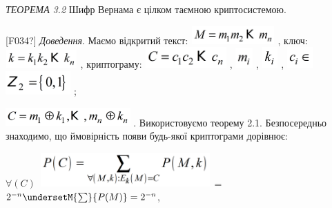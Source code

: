 \bigskip

\textit{ТЕОРЕМА }\textit{3}\textit{.2  }Шифр Вернама є цілком таємною
криптосистемою.

\textlatin{[F034?]} \textit{Доведення}. Маємо відкритий текст: 
\includegraphics[width=1.2591in,height=0.2709in]{crypt-img/crypt-img27.png} ,
ключ: 
\includegraphics[width=1.0827in,height=0.2791in]{crypt-img/crypt-img28.png} ,
криптограму: 
\includegraphics[width=1.2283in,height=0.3146in]{crypt-img/crypt-img29.png} , 
\includegraphics[width=0.2591in,height=0.3063in]{crypt-img/crypt-img30.png} , 
\includegraphics[width=0.2402in,height=0.3118in]{crypt-img/crypt-img31.png} , 
\includegraphics[width=0.3929in,height=0.3126in]{crypt-img/crypt-img32.png} 
\includegraphics[width=0.9835in,height=0.3547in]{crypt-img/crypt-img33.png} ;

 \includegraphics[width=1.8819in,height=0.2791in]{crypt-img/crypt-img34.png} . 
Використовуємо теорему 2.1. Безпосередньо знаходимо, що ймовірність появи
будь-якої криптограми дорівнює:

{\centering
 $\forall (C)$  
\includegraphics[width=2.5984in,height=0.5189in]{crypt-img/crypt-img35.png} =
$2^{-n}\undersetM{\sum }{P(M)}=2^{-n}$,
\par}

